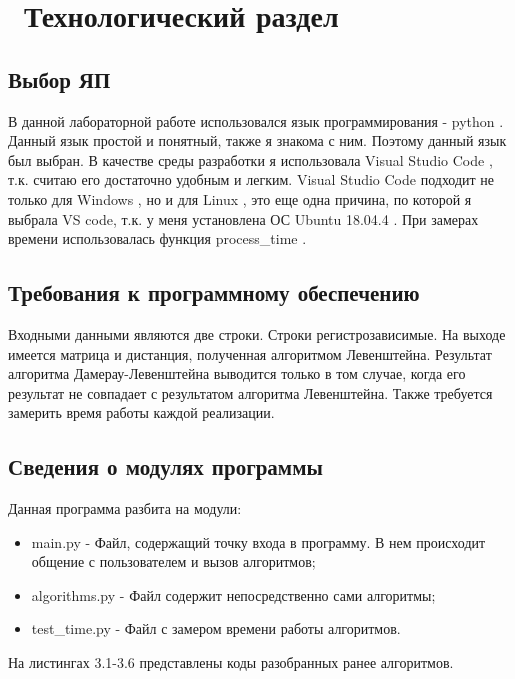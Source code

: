 \chapter{ Технологический раздел}
\label{cha:design}

\section{Выбор ЯП}

В данной лабораторной работе использовался язык программирования - python \cite{bib1}.
Данный язык простой и понятный, также я знакома с ним.
Поэтому данный язык был выбран. 
В качестве среды разработки я использовала Visual Studio Code \cite{bib2}, т.к. считаю его достаточно удобным и легким.
Visual Studio Code подходит не только для  Windows \cite{bib3}, но и для Linux \cite{bib4}, это еще одна причина, по которой я выбрала VS code, т.к. у меня установлена ОС Ubuntu 18.04.4 \cite{bib5}.
При замерах времени использовалась функция process\_time \cite{bib7}.

\section{Требования к программному обеспечению}

Входными данными являются две строки. Строки регистрозависимые. На выходе имеется матрица и дистанция, полученная алгоритмом Левенштейна. Результат алгоритма Дамерау-Левенштейна выводится только в том случае, когда его результат не совпадает с результатом алгоритма Левенштейна. Также требуется замерить время работы каждой реализации. 


\section{Сведения о модулях программы}

Данная программа разбита на модули:

\begin{itemize}
	\item main.py - Файл, содержащий точку входа в программу. В нем происходит общение с пользователем и вызов алгоритмов;
	\item algorithms.py - Файл содержит непосредственно сами алгоритмы;
	\item test\_time.py - Файл с замером времени работы алгоритмов.
\end{itemize}

На листингах 3.1-3.6 представлены коды разобранных ранее алгоритмов.

